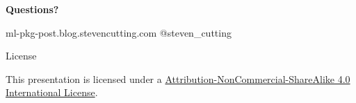 \documentclass[10pt]{beamer}
\newcommand{\themename}{\textbf{\textsc{metropolis}}\xspace}
\begin{document}







\begin{frame}[standout]

  \textbf{Questions?}

  ml-pkg-post.blog.stevencutting.com
  @steven\_cutting
  
\end{frame}



\begin{frame}{License}



  This presentation is licensed under a
  \href{https://creativecommons.org/licenses/by-nc-sa/4.0/}{Attribution-NonCommercial-ShareAlike 4.0 International License}.

  \begin{center}
    \ccbyncsa
  \end{center}

\end{frame}
\end{document}
